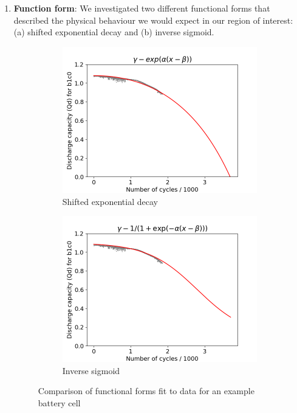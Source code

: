 \documentclass{article}
\begin{document}
\begin{enumerate}
    \item \textbf{Function form}: We investigated two different functional forms that described the physical behaviour we would expect in our region of interest: (a) shifted exponential decay and (b) inverse sigmoid.

    \begin{figure}[H]
        \centering
        \begin{subfigure}[b]{0.49\linewidth}
            \includegraphics[width=\linewidth]{figs/example_exponetial_decay.png}
            \caption{Shifted exponential decay}
        \end{subfigure}
        \begin{subfigure}[b]{0.49\linewidth}
            \includegraphics[width=\linewidth]{figs/example_inv_sigmoid.png}
            \caption{Inverse sigmoid}
        \end{subfigure}
        \caption{Comparison of functional forms fit to data for an example battery cell}
        \label{fig:funcforms}
    \end{figure}


\end{enumerate}
\end{document}

